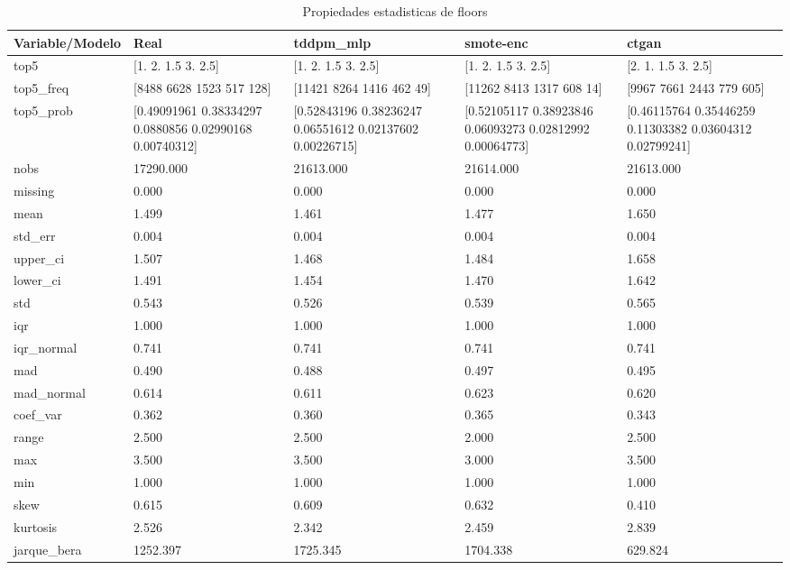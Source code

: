 \begin{table}[H]
\centering
\caption{Propiedades  estadisticas de floors}
\label{table-stats-floors}
\begin{tabular}{|l|m{10em}|m{10em}|m{10em}|m{10em}|}
\hline
 \rowcolor[gray]{0.8}
Variable/Modelo & Real & tddpm\_mlp & smote-enc & ctgan \\
\hline top5 & [1.  2.  1.5 3.  2.5] & [1.  2.  1.5 3.  2.5] & [1.  2.  1.5 3.  2.5] & [2.  1.  1.5 3.  2.5] \\
\hline top5\_freq & [8488 6628 1523  517  128] & [11421  8264  1416   462    49] & [11262  8413  1317   608    14] & [9967 7661 2443  779  605] \\
\hline top5\_prob & [0.49091961 0.38334297 0.0880856  0.02990168 0.00740312] & [0.52843196 0.38236247 0.06551612 0.02137602 0.00226715] & [0.52105117 0.38923846 0.06093273 0.02812992 0.00064773] & [0.46115764 0.35446259 0.11303382 0.03604312 0.02799241] \\
\hline nobs & 17290.000 & 21613.000 & 21614.000 & 21613.000 \\
\hline missing & 0.000 & 0.000 & 0.000 & 0.000 \\
\hline mean & 1.499 & 1.461 & 1.477 & 1.650 \\
\hline std\_err & 0.004 & 0.004 & 0.004 & 0.004 \\
\hline upper\_ci & 1.507 & 1.468 & 1.484 & 1.658 \\
\hline lower\_ci & 1.491 & 1.454 & 1.470 & 1.642 \\
\hline std & 0.543 & 0.526 & 0.539 & 0.565 \\
\hline iqr & 1.000 & 1.000 & 1.000 & 1.000 \\
\hline iqr\_normal & 0.741 & 0.741 & 0.741 & 0.741 \\
\hline mad & 0.490 & 0.488 & 0.497 & 0.495 \\
\hline mad\_normal & 0.614 & 0.611 & 0.623 & 0.620 \\
\hline coef\_var & 0.362 & 0.360 & 0.365 & 0.343 \\
\hline range & 2.500 & 2.500 & 2.000 & 2.500 \\
\hline max & 3.500 & 3.500 & 3.000 & 3.500 \\
\hline min & 1.000 & 1.000 & 1.000 & 1.000 \\
\hline skew & 0.615 & 0.609 & 0.632 & 0.410 \\
\hline kurtosis & 2.526 & 2.342 & 2.459 & 2.839 \\
\hline jarque\_bera & 1252.397 & 1725.345 & 1704.338 & 629.824 \\

\end{tabular}
\end{table}

